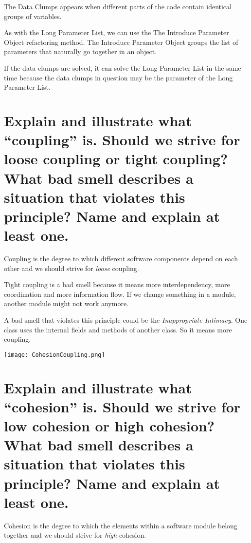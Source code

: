 The Data Clumps appears when different parts of the code contain identical groups of variables.\newline

As with the Long Parameter List, we can use the The Introduce Parameter Object refactoring method. The Introduce Parameter Object groups the list of parameters  that naturally go together in an object.\newline

If the data clumps are solved, it can solve the Long Parameter List in the same time because the data clumps in question may be the parameter of the Long Parameter List.

\section{Explain and illustrate what “coupling” is. Should we strive for loose coupling or tight
coupling? What bad smell describes a situation that violates this principle? Name and
explain at least one.}

Coupling is the degree to which different software components depend on each other and we should strive for \emph{loose} coupling.\newline

Tight coupling is a bad smell because it means more interdependency, more  coordination and more information flow. If we change something in a module, another module might not work anymore.\newline

A bad smell that violates this principle could be the \emph{Inappropriate Intimacy}. One class uses the internal fields and methods of another class. So it means more coupling.

\begin{center}
\texttt{[image: CohesionCoupling.png]}
\end{center}

\section{Explain and illustrate what “cohesion” is. Should we strive for low cohesion or high
cohesion? What bad smell describes a situation that violates this principle? Name and
explain at least one.}

Cohesion is the degree to which the elements within a software module belong together and we should strive for \emph{high} cohesion.\newline

